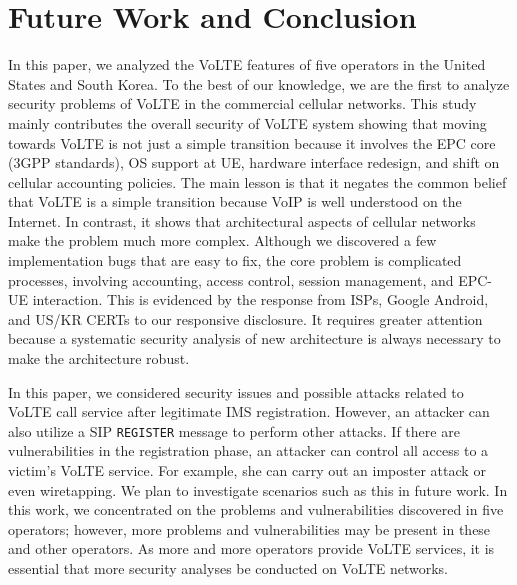 \chapter{Future Work and Conclusion}
\label{sec:concl}

In this paper, we analyzed the VoLTE features of five operators in the United
States and South Korea.  To the best of our knowledge, we are the first to
analyze security problems of VoLTE in the commercial cellular networks.  This
study mainly contributes the overall security of VoLTE system showing that
moving towards VoLTE is not just a simple transition because it involves the EPC
core (3GPP standards), OS support at UE, hardware interface redesign, and shift
on cellular accounting policies.  The main lesson is that it negates the common
belief that VoLTE is a simple transition because VoIP is well understood on the
Internet. In contrast, it shows that architectural aspects of cellular networks
make the problem much more complex.  Although we discovered a few implementation
bugs that are easy to fix, the core problem is complicated processes, involving
accounting, access control, session management, and EPC-UE interaction. This is
evidenced by the response from ISPs, Google Android, and US/KR CERTs to our
responsive disclosure. It requires greater attention because a systematic
security analysis of new architecture is always necessary to make the
architecture robust.

In this paper, we considered security issues and possible attacks related to
VoLTE call service after legitimate IMS registration.  However, an attacker can
also utilize a SIP {\tt REGISTER} message to perform other attacks.  If there
are vulnerabilities in the registration phase, an attacker can control all
access to a victim's VoLTE service.  For example, she can carry out an imposter
attack or even wiretapping.  We plan to investigate scenarios such as this in
future work.  In this work, we concentrated on the problems and vulnerabilities
discovered in five operators; however, more problems and vulnerabilities may be
present in these and other operators. As more and more operators provide VoLTE
services, it is essential that more security analyses be conducted on VoLTE
networks.


